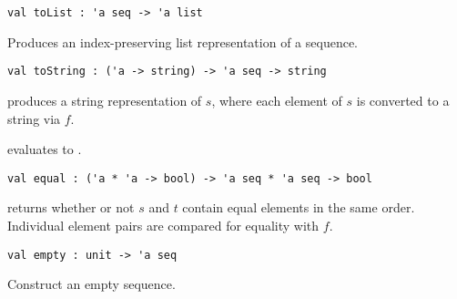 \begin{cluster}
\label{grp:gr:toList}

\begin{gram}[toList]
\label{gr:toList}
\begin{verbatim}
val toList : 'a seq -> 'a list
\end{verbatim}
Produces an index-preserving list representation of a sequence.

\end{gram}
\end{cluster}

\begin{flex}
\label{grp:grm:seq-interface::tostring}

\begin{gram}
\label{grm:seq-interface::tostring}
\begin{gram}[toString]
\label{gr:toString}
\begin{verbatim}
val toString : ('a -> string) -> 'a seq -> string
\end{verbatim}
 produces a string representation of $s$, where each
element of $s$ is converted to a string via $f$.
\end{gram}
\begin{example}
 evaluates to .
\end{example}

\end{gram}
\end{flex}

\begin{cluster}
\label{grp:gr:equal}

\begin{gram}[equal]
\label{gr:equal}
\begin{verbatim}
val equal : ('a * 'a -> bool) -> 'a seq * 'a seq -> bool
\end{verbatim}
 returns whether or not $s$ and $t$ contain equal elements
in the same order. Individual element pairs are compared for equality with $f$.

\end{gram}
\end{cluster}

\begin{cluster}
\label{grp:gr:empty}

\begin{gram}[empty]
\label{gr:empty}
\begin{verbatim}
val empty : unit -> 'a seq
\end{verbatim}
Construct an empty sequence.

\end{gram}
\end{cluster}

